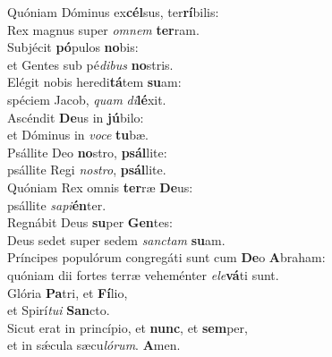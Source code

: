 \evenverse Quóniam Dóminus ex\textbf{cél}sus, ter\textbf{rí}bilis:~\*\\
\evenverse Rex magnus super \textit{om}\textit{nem} \textbf{ter}ram.\\
\oddverse Subjécit \textbf{pó}pulos \textbf{no}bis:~\*\\
\oddverse et Gentes sub pé\textit{di}\textit{bus} \textbf{no}stris.\\
\evenverse Elégit nobis heredi\textbf{tá}tem \textbf{su}am:~\*\\
\evenverse spéciem Jacob, \textit{quam} \textit{di}\textbf{lé}xit.\\
\oddverse Ascéndit \textbf{De}us in \textbf{jú}bilo:~\*\\
\oddverse et Dóminus in \textit{vo}\textit{ce} \textbf{tu}bæ.\\
\evenverse Psállite Deo \textbf{no}stro, \textbf{psál}lite:~\*\\
\evenverse psállite Regi \textit{no}\textit{stro}, \textbf{psál}lite.\\
\oddverse Quóniam Rex omnis \textbf{ter}ræ \textbf{De}us:~\*\\
\oddverse psállite \textit{sa}\textit{pi}\textbf{én}ter.\\
\evenverse Regnábit Deus \textbf{su}per \textbf{Gen}tes:~\*\\
\evenverse Deus sedet super sedem \textit{san}\textit{ctam} \textbf{su}am.\\
\oddverse Príncipes populórum congregáti sunt cum \textbf{De}o \textbf{A}braham:~\*\\
\oddverse quóniam dii fortes terræ veheménter \textit{e}\textit{le}\textbf{vá}ti sunt.\\
\evenverse Glória \textbf{Pa}tri, et \textbf{Fí}lio,~\*\\
\evenverse et Spirí\textit{tu}\textit{i} \textbf{San}cto.\\
\oddverse Sicut erat in princípio, et \textbf{nunc}, et \textbf{sem}per,~\*\\
\oddverse et in sǽcula sæcu\textit{ló}\textit{rum}. \textbf{A}men.\\
